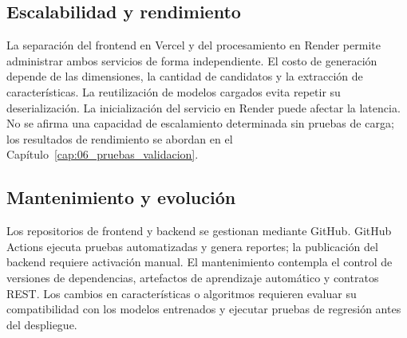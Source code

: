 \subsection{Escalabilidad y rendimiento}
La separación del frontend en Vercel y del procesamiento en Render permite administrar ambos servicios de forma independiente. El costo de generación depende de las dimensiones, la cantidad de candidatos y la extracción de características. La reutilización de modelos cargados evita repetir su deserialización. La inicialización del servicio en Render puede afectar la latencia. No se afirma una capacidad de escalamiento determinada sin pruebas de carga; los resultados de rendimiento se abordan en el Capítulo~\ref{cap:06_pruebas_validacion}.

\subsection{Mantenimiento y evolución}
Los repositorios de frontend y backend se gestionan mediante GitHub. GitHub Actions ejecuta pruebas automatizadas y genera reportes; la publicación del backend requiere activación manual. El mantenimiento contempla el control de versiones de dependencias, artefactos de aprendizaje automático y contratos REST. Los cambios en características o algoritmos requieren evaluar su compatibilidad con los modelos entrenados y ejecutar pruebas de regresión antes del despliegue.

